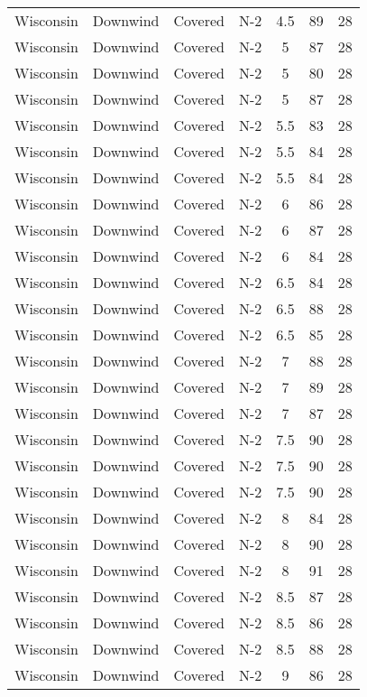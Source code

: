 \documentclass{article}
\begin{document}
\begin{longtable}[H]{ccccccc}
Wisconsin & Downwind & Covered     & N-2 & 4.5  & 89  & 28 \\
Wisconsin & Downwind & Covered     & N-2 & 5    & 87  & 28 \\
Wisconsin & Downwind & Covered     & N-2 & 5    & 80  & 28 \\
Wisconsin & Downwind & Covered     & N-2 & 5    & 87  & 28 \\
Wisconsin & Downwind & Covered     & N-2 & 5.5  & 83  & 28 \\
Wisconsin & Downwind & Covered     & N-2 & 5.5  & 84  & 28 \\
Wisconsin & Downwind & Covered     & N-2 & 5.5  & 84  & 28 \\
Wisconsin & Downwind & Covered     & N-2 & 6    & 86  & 28 \\
Wisconsin & Downwind & Covered     & N-2 & 6    & 87  & 28 \\
Wisconsin & Downwind & Covered     & N-2 & 6    & 84  & 28 \\
Wisconsin & Downwind & Covered     & N-2 & 6.5  & 84  & 28 \\
Wisconsin & Downwind & Covered     & N-2 & 6.5  & 88  & 28 \\
Wisconsin & Downwind & Covered     & N-2 & 6.5  & 85  & 28 \\
Wisconsin & Downwind & Covered     & N-2 & 7    & 88  & 28 \\
Wisconsin & Downwind & Covered     & N-2 & 7    & 89  & 28 \\
Wisconsin & Downwind & Covered     & N-2 & 7    & 87  & 28 \\
Wisconsin & Downwind & Covered     & N-2 & 7.5  & 90  & 28 \\
Wisconsin & Downwind & Covered     & N-2 & 7.5  & 90  & 28 \\
Wisconsin & Downwind & Covered     & N-2 & 7.5  & 90  & 28 \\
Wisconsin & Downwind & Covered     & N-2 & 8    & 84  & 28 \\
Wisconsin & Downwind & Covered     & N-2 & 8    & 90  & 28 \\
Wisconsin & Downwind & Covered     & N-2 & 8    & 91  & 28 \\
Wisconsin & Downwind & Covered     & N-2 & 8.5  & 87  & 28 \\
Wisconsin & Downwind & Covered     & N-2 & 8.5  & 86  & 28 \\
Wisconsin & Downwind & Covered     & N-2 & 8.5  & 88  & 28 \\
Wisconsin & Downwind & Covered     & N-2 & 9    & 86  & 28 \\

\end{longtable}
\end{document}
